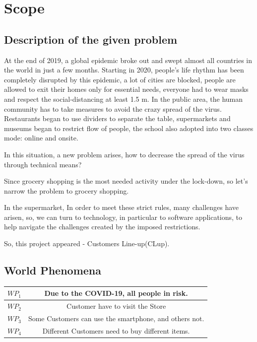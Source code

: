 \documentclass[a4paper,12pt]{report}
\begin{document}
\section{Scope}
\subsection{Description of the given problem}

At the end of 2019, a global epidemic broke out and swept almost all countries in the world in just a few months. Starting in 2020, people's life rhythm has been completely disrupted by this epidemic, a lot of cities are blocked, people are allowed to exit their homes only for essential needs, everyone had to wear masks and respect the social-distancing at least 1.5 m. In the public area, the human community has to take measures to avoid the crazy spread of the virus. Restaurants began to use dividers to separate the table, supermarkets and museums began to restrict flow of people, the school also adopted into two classes mode: online and onsite.

In this situation, a new problem arises, how to decrease the spread of the virus through technical means? 

Since grocery shopping is the most needed activity under the lock-down, so let’s narrow the problem to grocery shopping.

In the supermarket, In order to meet these strict rules, many challenges have arisen, so, we can turn to technology, in particular to software applications, to help navigate the challenges created by the imposed restrictions.

So, this project appeared - Customers Line-up(CLup).

\subsection{World Phenomena}

\begin{center}
	\begin{tabular}{ c|c } 
		\hline
		$WP_1$ & Due to the COVID-19, all people in risk. \\
		\hline
		$WP_2$ & Customer have to visit the Store \\
		\hline
		$WP_3$ & Some Customers can use the smartphone, and others not. \\
		\hline
		$WP_4$ & Different Customers need to buy different items. \\ 
		\hline
	\end{tabular}
\end{center}
\end{document}
